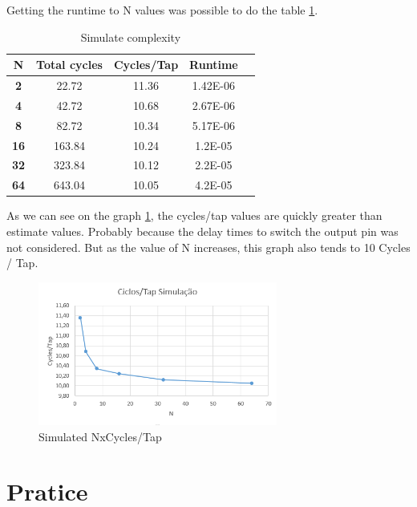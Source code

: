 \documentclass{article}
\begin{document}
Getting the runtime to N values was possible to do the table \ref{tab:S_C}.


\begin{table}[!ht]
\begin{center}
\caption{Simulate complexity}
\begin{tabular}{|c|c|c|c|c|}
\hline
\textbf{N} & \textbf{Total cycles} & \textbf{Cycles/Tap} & \textbf{Runtime} \\
\hline
\textbf{2}  & 22.72  & 11.36     & 1.42E-06  \\
\textbf{4}  & 42.72  & 10.68     & 2.67E-06  \\
\textbf{8}  & 82.72  & 10.34     & 5.17E-06  \\
\textbf{16} & 163.84 & 10.24     & 1.2E-05 \\
\textbf{32} & 323.84 & 10.12     & 2.2E-05 \\
\textbf{64} & 643.04 & 10.05     & 4.2E-05 \\
\hline
\end{tabular}
\label{tab:S_C}
\end{center}
\end{table}


As we can see on the graph \ref{fig:S_NxTap}, the cycles/tap values are quickly greater than estimate values. Probably because the delay times  to switch the output pin was not considered. But as the value of N increases, this graph also tends to 10 Cycles / Tap.

\begin{figure}[!ht]
\centering
\includegraphics[width=0.7\textwidth]
{./figuras/S_NxTAP.PNG}
\caption{Simulated NxCycles/Tap}
\label{fig:S_NxTap}
\end{figure}


\section{Pratice}
\end{document}
